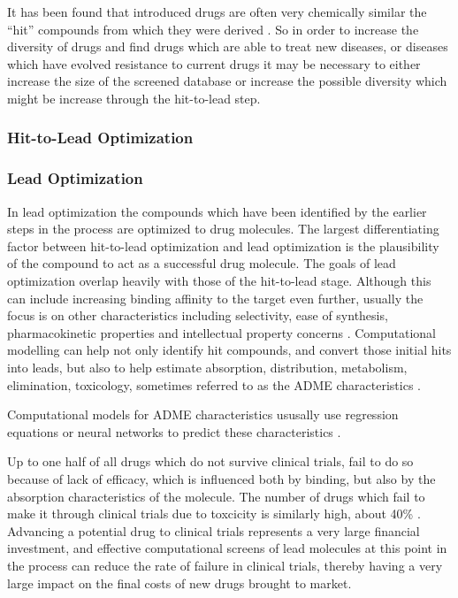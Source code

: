 It has been found that introduced drugs are often very chemically similar the ``hit'' compounds from which they were derived \cite{proudfoot2002drugs}.
So in order to increase the diversity of drugs and find drugs which are able to treat new diseases, or diseases which have evolved resistance to current drugs it may be necessary to either increase the size of the screened database or increase the possible diversity which might be increase through the hit-to-lead step.

\subsubsection{Hit-to-Lead Optimization}
\label{subsubsection:hit_to_lead}


\subsubsection{Lead Optimization}
\label{subsubsection:lead_optimization}
In lead optimization the compounds which have been identified by the earlier steps in the process are optimized to drug molecules.
The largest differentiating factor between hit-to-lead optimization and lead optimization is the plausibility of the compound to act as a successful drug molecule.
The goals of lead optimization overlap heavily with those of the hit-to-lead stage.
Although this can include increasing binding affinity to the target even further, usually the focus is on other characteristics including selectivity, ease of synthesis, pharmacokinetic properties and intellectual property concerns \cite{keserHu2006hit}.
Computational modelling can help not only identify hit compounds, and convert those initial hits into leads, but also to help estimate absorption, distribution, metabolism, elimination, toxicology, sometimes referred to as the ADME characteristics \cite{kerns2008drug}.

Computational models for ADME characteristics ususally use regression equations or neural networks to predict these characteristics \cite{jorgensen2004many}.

Up to one half of all drugs which do not survive clinical trials, fail to do so because of lack of efficacy, which is influenced both by binding, but also by the absorption characteristics of the molecule.
The number of drugs which fail to make it through clinical trials due to toxcicity is similarly high, about 40\% \cite{li2001screening}.
Advancing a potential drug to clinical trials represents a very large financial investment, and effective computational screens of lead molecules at this point in the process can reduce the rate of failure in clinical trials, thereby having a very large impact on the final costs of new drugs brought to market.
